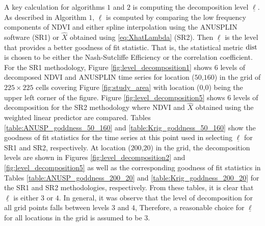 {A key calculation for algorithms $1$ and $2$ is computing the decomposition level $\underline{\ell}$. As described in Algorithm $1$, $\underline{\ell}$ is computed by comparing the low frequency components of NDVI and either spline interpolation using the ANUSPLIN software (SR1) or $\hat{X}$ obtained using \eqref{eq:XhatLambda} (SR2). Then $\underline{\ell}$ is the level that provides a better goodness of fit statistic. That is, the statistical metric $\rm{dist}$ is chosen to be either the Nash-Sutcliffe Efficiency or the correlation coefficient.  For the SR1 methodology, Figure \ref{fig:level_decomposition1} shows $6$ levels of decomposed NDVI and ANUSPLIN time series for location ($50$,$160$) in the grid of $225\times 225$ cells covering Figure \ref{fig:study_area} with location ($0$,$0$) being the upper left corner of the figure. Figure \ref{fig:level_decomposition5} shows $6$ levels of decomposition for the SR2 methodology where NDVI and $\hat{X}$ obtained using the weighted linear predictor are compared. Tables \ref{table:ANUSP_goddness_50_160} and \ref{table:Krig_goddness_50_160} show the goodness of fit statistics for the time series at this point used in selecting $\underline{\ell}$ for SR1 and SR2, respectively. At location ($200$,$20$) in the grid, the decomposition levels are shown in Figures \ref{fig:level_decomposition2} and \ref{fig:level_decomposition5} as well as the corresponding goodness of fit statistics in Tables \ref{table:ANUSP_goddness_200_20} and \ref{table:Krig_goddness_200_20}  for the  SR1 and SR2 methodologies, respectively. From these tables, it is clear that $\underline{\ell}$ is either $3$ or $4$. In general, it was observe that the level of decomposition for all grid points falls between levels $3$ and $4$,  Therefore, a  reasonable choice for $\underline{\ell}$ for all locations in the grid is assumed to be $3$. 



}
